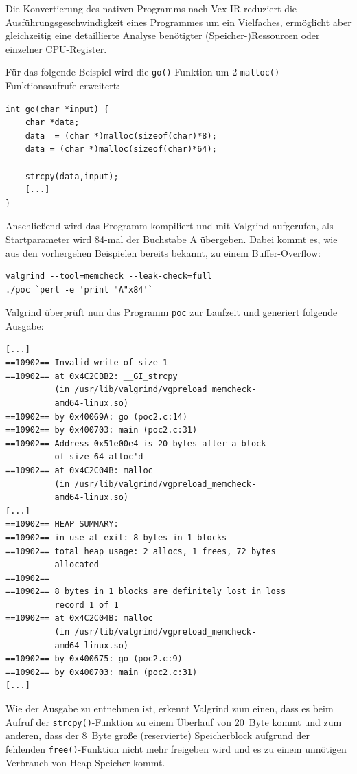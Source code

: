 Die Konvertierung des nativen Programms nach Vex IR reduziert die 
Ausführungsgeschwindigkeit eines Programmes um ein Vielfaches, 
ermöglicht aber gleichzeitig eine detaillierte Analyse  benötigter 
(Speicher-)Ressourcen oder einzelner CPU-Register.

Für das folgende Beispiel wird die \texttt{go()}-Funktion um 2 
\texttt{malloc()}-Funktionsaufrufe erweitert:

\begin{lstlisting}[basicstyle=\ttfamily\footnotesize]
int go(char *input) {
    char *data;	
    data  = (char *)malloc(sizeof(char)*8);
    data = (char *)malloc(sizeof(char)*64);

    strcpy(data,input);
    [...]
}
\end{lstlisting}

Anschließend wird das Programm kompiliert und mit Valgrind aufgerufen, 
als Startparameter wird 84-mal der Buchstabe A übergeben. Dabei kommt 
es, wie aus den vorhergehen Beispielen bereits bekannt, zu einem 
Buffer-Overflow:

\begin{lstlisting}[basicstyle=\ttfamily\footnotesize]
valgrind --tool=memcheck --leak-check=full 
./poc `perl -e 'print "A"x84'`
\end{lstlisting}

Valgrind überprüft nun das Programm \texttt{poc} zur Laufzeit und 
generiert folgende Ausgabe:

\begin{lstlisting}[basicstyle=\ttfamily\footnotesize]
[...]
==10902== Invalid write of size 1
==10902== at 0x4C2CBB2: __GI_strcpy 
          (in /usr/lib/valgrind/vgpreload_memcheck- 
          amd64-linux.so)
==10902== by 0x40069A: go (poc2.c:14)
==10902== by 0x400703: main (poc2.c:31)
==10902== Address 0x51e00e4 is 20 bytes after a block 
          of size 64 alloc'd
==10902== at 0x4C2C04B: malloc 
          (in /usr/lib/valgrind/vgpreload_memcheck- 
          amd64-linux.so)
[...]
==10902== HEAP SUMMARY:
==10902== in use at exit: 8 bytes in 1 blocks
==10902== total heap usage: 2 allocs, 1 frees, 72 bytes 
          allocated
==10902==
==10902== 8 bytes in 1 blocks are definitely lost in loss 
		  record 1 of 1
==10902== at 0x4C2C04B: malloc 
          (in /usr/lib/valgrind/vgpreload_memcheck-
          amd64-linux.so)
==10902== by 0x400675: go (poc2.c:9)
==10902== by 0x400703: main (poc2.c:31)
[...]
\end{lstlisting}

Wie der Ausgabe zu entnehmen ist, erkennt Valgrind zum einen, dass es 
beim Aufruf der \texttt{strcpy()}-Funktion zu einem Überlauf von \SI{20}{Byte} 
kommt und zum anderen, dass der \SI{8}{Byte} große (reservierte) 
Speicherblock aufgrund der fehlenden \texttt{free()}-Funktion nicht mehr 
freigeben wird und es zu einem unnötigen Verbrauch von Heap-Speicher kommt.

